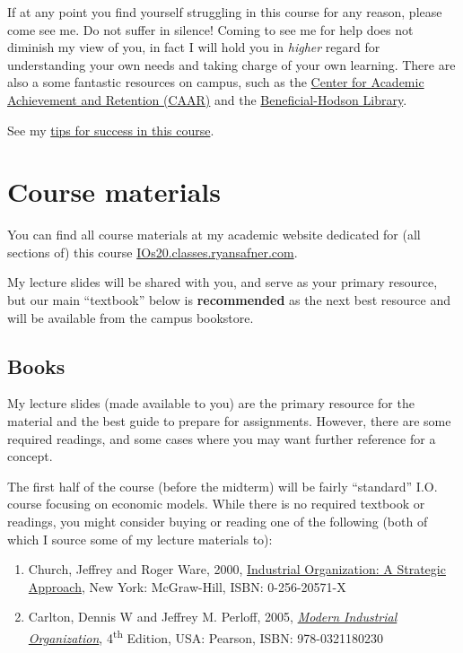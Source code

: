 \documentclass{article}
\begin{document}
If at any point you find yourself struggling in this course for any
reason, please come see me. Do not suffer in silence! Coming to see me
for help does not diminish my view of you, in fact I will hold you in
\emph{higher} regard for understanding your own needs and taking charge
of your own learning. There are also a some fantastic resources on
campus, such as the
\href{http://www.hood.edu/campus-services/academic-services/index.html}{Center
for Academic Achievement and Retention (CAAR)} and the
\href{http://www.hood.edu/library/}{Beneficial-Hodson Library}.

See my \href{http://devf19.classes.ryansafner.com/reference\#tips}{tips
for success in this course}.

\hypertarget{course-materials}{%
\section{Course materials}\label{course-materials}}

You can find all course materials at my academic website dedicated for
(all sections of) this course
\href{http://ios20.classes.ryansafner.com}{IOs20.classes.ryansafner.com}.

My lecture slides will be shared with you, and serve as your primary
resource, but our main ``textbook'' below is \textbf{recommended} as the
next best resource and will be available from the campus bookstore.

\hypertarget{books}{%
\subsection{Books}\label{books}}

My lecture slides (made available to you) are the primary resource for
the material and the best guide to prepare for assignments. However,
there are some required readings, and some cases where you may want
further reference for a concept.

The first half of the course (before the midterm) will be fairly
``standard'' I.O. course focusing on economic models. While there is no
required textbook or readings, you might consider buying or reading one
of the following (both of which I source some of my lecture materials
to):

\begin{enumerate}
\def\labelenumi{\arabic{enumi}.}
\item
  Church, Jeffrey and Roger Ware, 2000,
  \href{https://works.bepress.com/jeffrey_church/23/}{Industrial
  Organization: A Strategic Approach}, New York: McGraw-Hill, ISBN:
  0-256-20571-X
\item
  Carlton, Dennis W and Jeffrey M. Perloff, 2005,
  \href{https://www.amazon.com/Modern-Industrial-Organization-Dennis-Carlton/dp/0321180232}{\emph{Modern
  Industrial Organization}}, 4\textsuperscript{th} Edition, USA:
  Pearson, ISBN: 978-0321180230
\end{enumerate}
\end{document}
